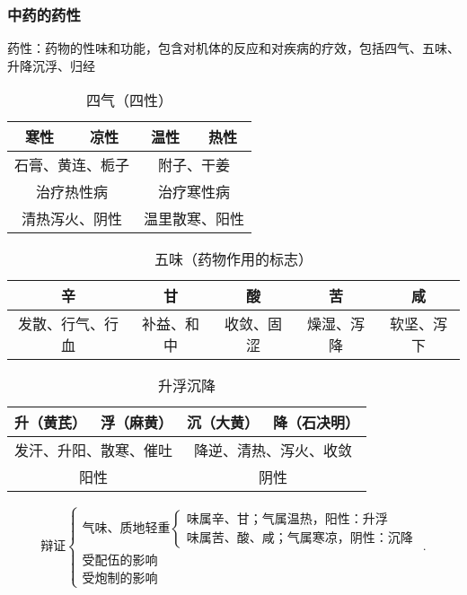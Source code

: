 \subsubsection*{中药的药性}%
\label{subsub:中药的药性}
\begin{defi}
    药性：药物的性味和功能，包含对机体的反应和对疾病的疗效，包括四气、五味、升降沉浮、归经
\end{defi}
\begin{table}[htpb]
    \centering
    \caption{四气（四性）}
    \label{tab:四气（四性）}
    \begin{tabular}{cccc}
    \toprule
    寒性 & 凉性 & 温性 & 热性\\
    \midrule
    \multicolumn{2}{c}{石膏、黄连、栀子} & \multicolumn{2}{c}{附子、干姜}\\
    \midrule
    \multicolumn{2}{c}{治疗热性病} & \multicolumn{2}{c}{治疗寒性病}\\
    \multicolumn{2}{c}{清热泻火、阴性} & \multicolumn{2}{c}{温里散寒、阳性}\\
    \bottomrule
    \end{tabular}
\end{table}
\begin{table}[htpb]
    \centering
    \caption{五味（药物作用的标志）}
    \label{tab:五味-药物作用的标志-}
    \begin{tabular}{ccccc}
    \toprule
    辛 & 甘 & 酸 & 苦 & 咸\\
    \midrule
    发散、行气、行血 & 补益、和中 & 收敛、固涩 & 燥湿、泻降 & 软坚、泻下\\
    \bottomrule
    \end{tabular}
\end{table}
\begin{table}[htpb]
    \centering
    \caption{升浮沉降}
    \label{tab:升浮沉降}
    \begin{tabular}{cccc}
    \toprule
    升（黄芪）& 浮（麻黄） & 沉（大黄）& 降（石决明）\\
    \midrule
    \multicolumn{2}{c}{发汗、升阳、散寒、催吐} & \multicolumn{2}{c}{降逆、清热、泻火、收敛}\\
    \midrule
    \multicolumn{2}{c}{阳性} & \multicolumn{2}{c}{阴性}\\
    \bottomrule
    \end{tabular}
\end{table}
\[
    \text{辩证}
    \begin{cases}
        \text{气味、质地轻重}
        \begin{cases}
            \text{味属辛、甘；气属温热，阳性：升浮}\\ 
            \text{味属苦、酸、咸；气属寒凉，阴性：沉降}
        \end{cases}\\ 
        \text{受配伍的影响}\\ 
        \text{受炮制的影响}
    \end{cases}
.\]
